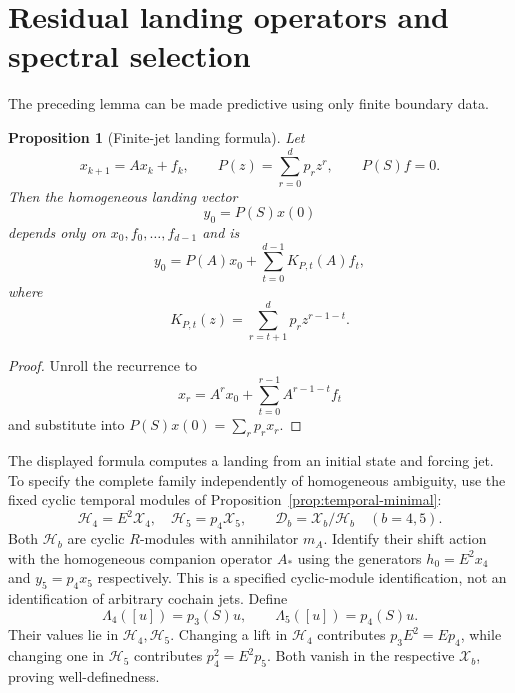 \documentclass[11pt]{amsart}
\newtheorem{proposition}[theorem]{Proposition}
\begin{document}
\section{Residual landing operators and spectral selection}\label{sec:landing}

The preceding lemma can be made predictive using only finite boundary data.

\begin{proposition}[Finite-jet landing formula]\label{prop:finite-jet-landing}
Let
\[
x_{k+1}=Ax_k+f_k,
\qquad
P(z)=\sum_{r=0}^dp_rz^r,
\qquad
P(S)f=0.
\]
Then the homogeneous landing vector
\[
y_0=P(S)x(0)
\]
depends only on $x_0,f_0,\ldots,f_{d-1}$ and is
\[
\boxed{
y_0=P(A)x_0+\sum_{t=0}^{d-1}K_{P,t}(A)f_t,
}
\]
where
\[
K_{P,t}(z)=\sum_{r=t+1}^dp_rz^{r-1-t}.
\]
\end{proposition}

\begin{proof}
Unroll the recurrence to
\[
x_r=A^rx_0+\sum_{t=0}^{r-1}A^{r-1-t}f_t
\]
and substitute into $P(S)x(0)=\sum_rp_rx_r$.
\end{proof}

The displayed formula computes a landing from an initial state and forcing
jet. To specify the complete family independently of homogeneous ambiguity,
use the fixed cyclic temporal modules of Proposition~\ref{prop:temporal-minimal}:
\[
\mathcal H_4=E^2\mathcal X_4,\quad
\mathcal H_5=p_4\mathcal X_5,\qquad
\mathscr D_b=\mathcal X_b/\mathcal H_b\quad(b=4,5).
\]
Both $\mathcal H_b$ are cyclic $R$-modules with annihilator $m_A$.
Identify their shift action with the homogeneous companion operator $A_*$
using the generators $h_0=E^2x_4$ and $y_5=p_4x_5$ respectively.
This is a specified cyclic-module identification, not an identification
of arbitrary cochain jets. Define
\[
\Lambda_4([u])=p_3(S)u,\qquad \Lambda_5([u])=p_4(S)u.
\]
Their values lie in $\mathcal H_4,\mathcal H_5$. Changing a lift in
$\mathcal H_4$ contributes $p_3E^2=Ep_4$, while changing one in
$\mathcal H_5$ contributes $p_4^2=E^2p_5$. Both vanish in the respective
$\mathcal X_b$, proving well-definedness.
\end{document}
